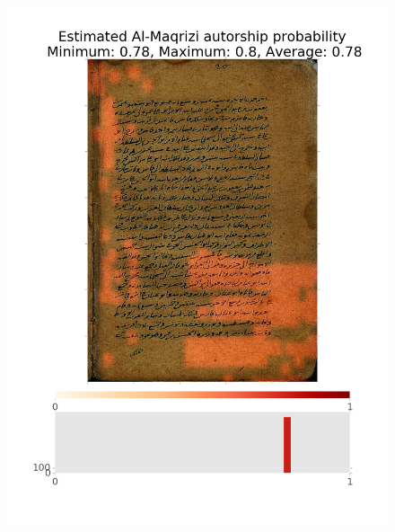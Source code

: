\documentclass[conference,a4paper,twocolumn]{IEEEtran}
\begin{document}
\begin{figure}
\begin{minipage}{.45\linewidth}
  \includegraphics[width=\linewidth]{figures/components_al_maqrisi.png}
  \label{img2}
\end{minipage}
\end{figure}
\end{document}
